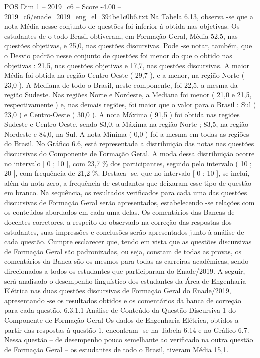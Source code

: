\begin{textsample}{POS Dim 1 – 2019\_c6 – Score -4.00 – 2019\_c6/enade\_2019\_eng\_el\_394be1c0b6.txt}
Na Tabela 6.13, observa -se que a nota Média nesse conjunto de questões foi inferior à obtida nas objetivas.
Os estudantes de o todo Brasil obtiveram, em Formação Geral, Média 52,5, nas questões objetivas, e 25,0, nas questões discursivas.
Pode -se notar, também, que o Desvio padrão nesse conjunto de questões foi menor do que o obtido nas objetivas : 21,5, nas questões objetivas e 17,7, nas questões discursivas.
A maior Média foi obtida na região Centro-Oeste ( 29,7 ), e a menor, na região Norte ( 23,0 ).
A Mediana de todo o Brasil, neste componente, foi 22,5, a mesma da região Sudeste.
Nas regiões Norte e Nordeste, a Mediana foi menor ( 21,0 e 21,5, respectivamente ) e, nas demais regiões, foi maior que o valor para o Brasil : Sul ( 23,0 ) e Centro-Oeste ( 30,0 ).
A nota Máxima ( 91,5 ) foi obtida nas regiões Sudeste e Centro-Oeste, sendo 83,0, a Máxima na região Norte ; 83,5, na região Nordeste e 84,0, na Sul.
A nota Mínima ( 0,0 ) foi a mesma em todas as regiões do Brasil.
No Gráfico 6.6, está representada a distribuição das notas nas questões discursivas do Componente de Formação Geral.
A moda dessa distribuição ocorre no intervalo [ 0 ; 10 ], com 23,7 \% dos participantes, seguido pelo intervalo ( 10 ; 20 ], com frequência de 21,2 \%.
Destaca -se, que no intervalo [ 0 ; 10 ], se inclui, além da nota zero, a frequência de estudantes que deixaram esse tipo de questão em branco.
Na sequência, os resultados verificados para cada uma das questões discursivas de Formação Geral serão apresentados, estabelecendo -se relações com os conteúdos abordados em cada uma delas.
Os comentários das Bancas de docentes corretores, a respeito do observado na correção das respostas dos estudantes, suas impressões e conclusões serão apresentados junto à análise de cada questão.
Cumpre esclarecer que, tendo em vista que as questões discursivas de Formação Geral são padronizadas, ou seja, constam de todas as provas, os comentários da Banca são os mesmos para todas as carreiras acadêmicas, sendo direcionados a todos os estudantes que participaram do Enade/2019.
A seguir, será analisado o desempenho linguístico dos estudantes da Área de Engenharia Elétrica nas duas questões discursivas de Formação Geral do Enade/2019, apresentando -se os resultados obtidos e os comentários da banca de correção para cada questão. 6.3.1.1 Análise de Conteúdo da Questão Discursiva 1 do Componente de Formação Geral Os dados de Engenharia Elétrica, obtidos a partir das respostas à questão 1, encontram -se na Tabela 6.14 e no Gráfico 6.7.
Nessa questão – de desempenho pouco semelhante ao verificado na outra questão de Formação Geral – os estudantes de todo o Brasil, tiveram Média 15,1.

\end{textsample}

